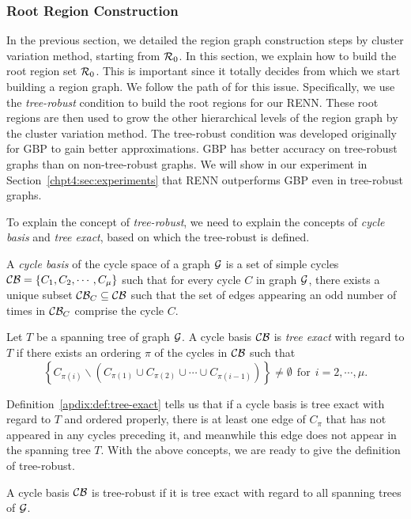 \subsubsection{Root Region Construction}
\label{sec:criteria-root-regions}
In the previous section, we detailed the region graph construction steps by cluster variation method, starting from $\mathcal{R}_0$. In this section, we explain how to build the root region set $\mathcal{R}_0$. This is important since it totally decides from which we start building a region graph.
We follow the path of \cite{welling2005structured, gelfand2012generalized} for this issue.
Specifically, we use the \textit{tree-robust} condition \cite{gelfand2012generalized} to build the root regions for our RENN. These root regions are then used to grow the other hierarchical levels of the region graph by the cluster variation method. The tree-robust condition was developed originally for GBP to gain better approximations. GBP has better accuracy on tree-robust graphs than on non-tree-robust graphs. We will show in our experiment in Section~\ref{chpt4:sec:experiments} that RENN outperforms GBP even in tree-robust graphs. 


To explain the concept of \textit{tree-robust}, we need to explain the concepts of \textit{cycle basis} and \textit{tree exact}, based on which the tree-robust is defined.
\begin{definition}\label{apdix:def:cycle-basis}
  A \textit{cycle basis} of the cycle space of a graph $\mathcal{G}$ is a
  set of simple cycles $\mathcal{C}\mathcal{B} =\left\{ C_1, C_2, \cdots, C_{\mu}
  \right\}$ such that for every cycle $C$ in graph $\mathcal{G}$, there
  exists a unique subset $\mathcal{C}\mathcal{B}_{C} \subseteq \mathcal{C}\mathcal{B}$ such that the
  set of edges appearing an odd number of times in $\mathcal{C}\mathcal{B}_C$ comprise the cycle $C$.
\end{definition}
\begin{definition}\label{apdix:def:tree-exact}
  Let $T$ be a spanning tree of graph $\mathcal{G}$. A cycle basis $\mathcal{C}\mathcal{B}$ is \textit{tree exact} with regard to $T$ if there exists an ordering $\pi$ of the cycles in $\mathcal{C}\mathcal{B}$ such that
  \begin{equation*}
    \left\{ C_{\pi(i)} \backslash \left( C_{\pi(1)} \cup C_{\pi(2)} \cup \cdots \cup C_{\pi(i-1)} \right) \right\} \neq \emptyset~~\mathrm{for}~~ i=2,\cdots, \mu.
  \end{equation*}
\end{definition}
Definition~\ref{apdix:def:tree-exact} tells us that if a cycle basis is tree exact with regard to $T$ and ordered properly, there is at least one edge of $C_{\pi}$ that has not appeared in any cycles preceding it, and meanwhile this edge does not appear in the spanning tree $T$.
With the above concepts, we are ready to give the definition of tree-robust.
\begin{definition}
  A cycle basis $\mathcal{C}\mathcal{B}$ is tree-robust if it is tree exact with regard to all spanning trees of $\mathcal{G}$.
\end{definition}


